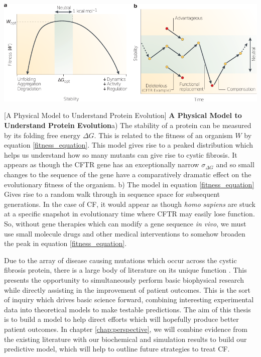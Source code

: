 	\begin{center}
		\includegraphics[width=1.0\textwidth]{figures/fitness_landscape_fig.pdf}
	\end{center}
	\begingroup
	\captionsetup{singlelinecheck = false, justification=raggedright}
	[A Physical Model to Understand Protein Evolution] {\textbf{A Physical Model to Understand Protein Evolution}}{a) The stability of a protein can be measured by its folding free energy $\Delta G$. This is related to the fitness of an organism $W$ by equation \ref{fitness_equation}. This model gives rise to a peaked distribution which helps us understand how so many mutants can give rise to cystic fibrosis. It appears as though the CFTR gene has an exceptionally narrow $\sigma_{\Delta G}$ and so small changes to the sequence of the gene have a comparatively dramatic effect on the evolutionary fitness of the organism. b) The model in equation \ref{fitness_equation} Gives rise to a random walk through in sequence space for subsequent generations. In the case of CF, it would appear as though \textit{homo sapiens} are stuck at a specific snapshot in evolutionary time where CFTR may easily lose function. So, without gene therapies which can modify a gene sequence \textit {in vivo}, we must use small molecule drugs and other medical interventions to somehow broaden the peak in equation \ref{fitness_equation}.}
	\label{fitness_landscape_figure}
\endgroup

Due to the array of disease causing mutations which occur across the cystic fibrosis protein, there is a large body of literature on its unique function \cite{csanady2019a}. This presents the opportunity to simultaneously perform basic biophysical research while directly assisting in the improvement of patient outcomes. This is the sort of inquiry which drives basic science forward, combining interesting experimental data into theoretical models to make testable predictions. The aim of this thesis is to build a model to help direct efforts which will hopefully produce better patient outcomes. In chapter \ref{chap:perspective}, we will combine evidence from the existing literature with our biochemical and simulation results to build our predictive model, which will help to outline future strategies to treat CF.

